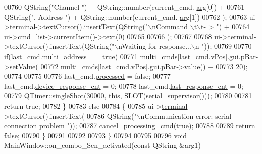 \begin{DoxyCode}
00760                                             QString(\textcolor{stringliteral}{"Channel "}) + QString::number(current\_cmd.
      \hyperlink{a00001_a56e6c2d7315d0ae60a51e8b140c9cfe4}{arg}[0]) +
00761                                             QString(\textcolor{stringliteral}{", Address "}) + QString::number(current\_cmd.
      \hyperlink{a00001_a56e6c2d7315d0ae60a51e8b140c9cfe4}{arg}[1])
00762                                             );
00763       ui->\hyperlink{a00027_aae71c46ea4546df5994735dee573b2dd}{terminal}->textCursor().insertText(QString(\textcolor{stringliteral}{"\(\backslash\)nCommand \(\backslash\)t\(\backslash\)t- > "}) +
00764                                             ui->\hyperlink{a00027_aa66ece71395b435e915d384fb63bac1d}{cmd\_list}->currentItem()->text(0)
00765 
00766                                             );
00767 
00768       ui->\hyperlink{a00027_aae71c46ea4546df5994735dee573b2dd}{terminal}->textCursor().insertText(QString(\textcolor{stringliteral}{"\(\backslash\)nWaiting for response...\(\backslash\)n "}));
00769 
00770       \textcolor{keywordflow}{if}(last\_cmd.\hyperlink{a00001_a8e69b971c61ced27a7567efd2bf0db59}{multi\_address} == \textcolor{keyword}{true})
00771       multi\_cmds[last\_cmd.\hyperlink{a00001_a2b48b371fd84be2a8ad581b1ad708b88}{vPos}].gui.pBar->setValue(
00772               multi\_cmds[last\_cmd.\hyperlink{a00001_a2b48b371fd84be2a8ad581b1ad708b88}{vPos}].gui.pBar->value() +
00773               20);
00774 
00775 
00776       last\_cmd.\hyperlink{a00001_a3e88f779da9798a5da7dda227e2ca388}{processed}           = \textcolor{keyword}{false};
00777       last\_cmd.\hyperlink{a00001_a2b37e66e2555cf1dc26439ad7c30ea78}{device\_response\_cnt} = 0;
00778       last\_cmd.\hyperlink{a00001_a44be27a056581b6e706ec1ab28ce46e0}{last\_response\_cnt}   = 0;
00779       QTimer::singleShot(30000, \textcolor{keyword}{this}, SLOT(serial\_supervisor()));
00780 
00781       \textcolor{keywordflow}{return} \textcolor{keyword}{true};
00782       \}
00783       \textcolor{keywordflow}{else}
00784       \{
00785          ui->\hyperlink{a00027_aae71c46ea4546df5994735dee573b2dd}{terminal}->textCursor().insertText(
00786         QString(\textcolor{stringliteral}{"\(\backslash\)nCommunication error: serial connection problem "}));
00787         cancel\_processing\_cmd(\textcolor{keyword}{true});
00788 
00789        \textcolor{keywordflow}{return} \textcolor{keyword}{false};
00790       \}
00791 
00792 
00793 \}
00794 
00795 
00796 \textcolor{keywordtype}{void} MainWindow::on\_combo\_Sen\_activated(\textcolor{keyword}{const} QString &arg1)

\end{DoxyCode}

